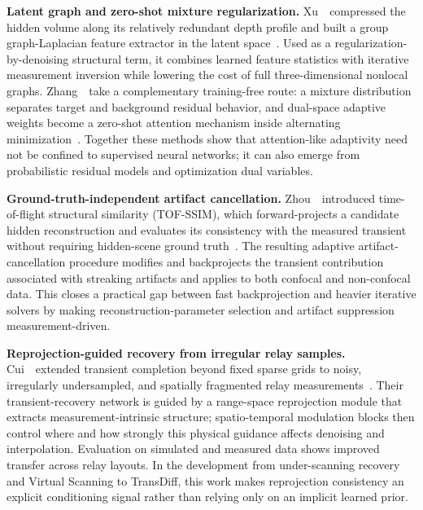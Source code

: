 \vspace{0.8mm}
\noindent \textbf{Latent graph and zero-shot mixture regularization.}
Xu~\etal~compressed the hidden volume along its relatively redundant depth profile and built a group graph-Laplacian feature extractor in the latent space~\cite{xuGraphLatentNLOS2025}. Used as a regularization-by-denoising structural term, it combines learned feature statistics with iterative measurement inversion while lowering the cost of full three-dimensional nonlocal graphs. Zhang~\etal~take a complementary training-free route: a mixture distribution separates target and background residual behavior, and dual-space adaptive weights become a zero-shot attention mechanism inside alternating minimization~\cite{zhangAdaptiveMixtureZeroShot2025}. Together these methods show that attention-like adaptivity need not be confined to supervised neural networks; it can also emerge from probabilistic residual models and optimization dual variables.

\vspace{0.8mm}
\noindent \textbf{Ground-truth-independent artifact cancellation.}
Zhou~\etal~introduced time-of-flight structural similarity (TOF-SSIM), which forward-projects a candidate hidden reconstruction and evaluates its consistency with the measured transient without requiring hidden-scene ground truth~\cite{zhouAdaptiveArtifactCancellation2025}. The resulting adaptive artifact-cancellation procedure modifies and backprojects the transient contribution associated with streaking artifacts and applies to both confocal and non-confocal data. This closes a practical gap between fast backprojection and heavier iterative solvers by making reconstruction-parameter selection and artifact suppression measurement-driven.

\vspace{0.8mm}
\noindent \textbf{Reprojection-guided recovery from irregular relay samples.}
Cui~\etal~extended transient completion beyond fixed sparse grids to noisy, irregularly undersampled, and spatially fragmented relay measurements~\cite{cuiReprojectionGuidedNLOS2025}. Their transient-recovery network is guided by a range-space reprojection module that extracts measurement-intrinsic structure; spatio-temporal modulation blocks then control where and how strongly this physical guidance affects denoising and interpolation. Evaluation on simulated and measured data shows improved transfer across relay layouts. In the development from under-scanning recovery and Virtual Scanning to TransDiff, this work makes reprojection consistency an explicit conditioning signal rather than relying only on an implicit learned prior.

